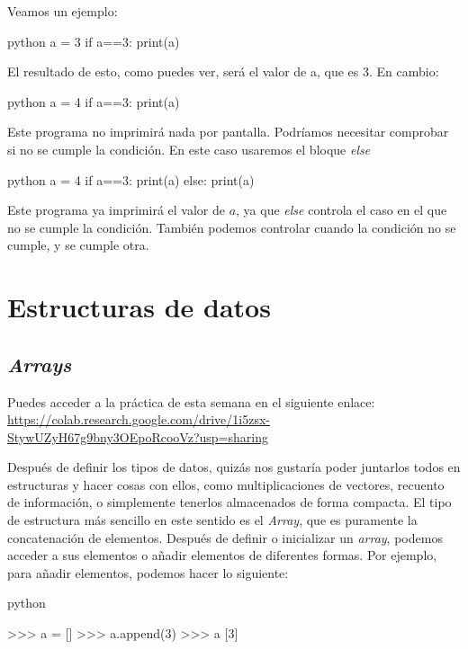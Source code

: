 \documentclass{article}
\begin{document}
Veamos un ejemplo:

\begin{mintedbox}{python}
a = 3
if a==3:
    print(a)
\end{mintedbox}

El resultado de esto, como puedes ver, será el valor de a, que es 3. En cambio:
\begin{mintedbox}{python}
a = 4
if a==3:
    print(a)
\end{mintedbox}
Este programa no imprimirá nada por pantalla. Podríamos necesitar comprobar si no se cumple la condición. En este caso usaremos el bloque \textit{else}
\begin{mintedbox}{python}
a = 4
if a==3:
    print(a)
else:
    print(a)

\end{mintedbox}
Este programa ya imprimirá el valor de $a$, ya que \textit{else} controla el caso en el que no se cumple la condición. También podemos controlar cuando la condición no se cumple, y se cumple otra.

\section{Estructuras de datos}



\subsection{\textit{Arrays}}
Puedes acceder a la práctica de esta semana en el siguiente enlace: \url{https://colab.research.google.com/drive/1i5zsx-StywUZyH67g9bny3OEpoRcooVz?usp=sharing}

Después de definir los tipos de datos, quizás nos gustaría poder juntarlos todos en estructuras y hacer cosas con ellos, como multiplicaciones de vectores, recuento de información, o simplemente tenerlos almacenados de forma compacta. El tipo de estructura más sencillo en este sentido es el \textit{Array}, que es puramente la concatenación de elementos. Después de definir o inicializar un \textit{array}, podemos acceder a sus elementos o añadir elementos de diferentes formas. Por ejemplo, para añadir elementos, podemos hacer lo siguiente:

\begin{mintedbox}{python}

>>> a = []
>>> a.append(3)
>>> a
[3]

\end{mintedbox}
\end{document}
